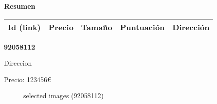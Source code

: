 \documentclass[10pt,a4paper]{report}
\begin{document}
{\LARGE \textbf{Resumen}}

\begin{center}
\begin{tabular}{|c|c|c|c|c|}
\hline
Id (link) & Precio & Tamaño & Puntuación & Dirección \\\hline\hline
\end{tabular}
\end{center}


\newpage
\begin{center}
\begin{large}
\textbf{92058112}\\[10px]
\end{large}
Direccion
\end{center}
Precio: 123456€
\begin{figure}[htbp]
\caption{selected images (92058112)}
\end{figure}
\end{document}
